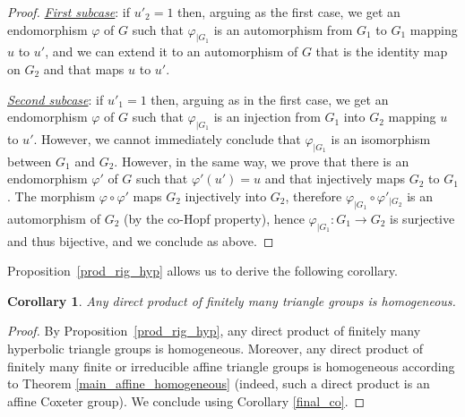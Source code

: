 \documentclass[a4paper, 11pt]{amsart}
\newtheorem{co}[te]{Corollary}
\theoremstyle{definition}
\theoremstyle{remark}
\renewcommand{\geq}{\geqslant}
\begin{document}
\begin{proof}
\smallskip \noindent 
\underline{\emph{First subcase}}: if $u'_2=1$ then, arguing as the first case, we get an endomorphism $\varphi$ of $G$ such that $\varphi_{\vert G_1}$ is an automorphism from $G_1$ to $G_1$ mapping $u$ to $u'$, and we can extend it to an automorphism of $G$ that is the identity map on $G_2$ and that maps $u$ to $u'$.

\smallskip \noindent
\underline{\emph{Second subcase}}: if $u'_1=1$ then, arguing as in the first case, we get an endomorphism $\varphi$ of $G$ such that $\varphi_{\vert G_1}$ is an injection from $G_1$ into $G_2$ mapping $u$ to $u'$. However, we cannot immediately conclude that $\varphi_{\vert G_1}$ is an isomorphism between $G_1$ and $G_2$. However, in the same way, we prove that there is an endomorphism $\varphi'$ of $G$ such that $\varphi'(u')=u$ and that injectively maps $G_2$ to $G_1$. The morphism $\varphi\circ \varphi'$ maps $G_2$ injectively into $G_2$, therefore $\varphi_{\vert G_1}\circ \varphi'_{\vert G_2}$ is an automorphism of $G_2$ (by the co-Hopf property), hence $\varphi_{\vert G_1}: G_1\rightarrow G_2$ is surjective and thus bijective, and we conclude as above.\end{proof}

Proposition~\ref{prod_rig_hyp} allows us to derive the following corollary.

\begin{co}\label{cor_triangle}
Any direct product of finitely many triangle groups is homogeneous.   
\end{co}

\begin{proof}
By Proposition~\ref{prod_rig_hyp}, any direct product of finitely many hyperbolic triangle groups is homogeneous. Moreover, any direct product of finitely many finite or irreducible affine triangle groups is homogeneous according to Theorem \ref{main_affine_homogeneous} (indeed, such a direct product is an affine Coxeter group). We conclude using Corollary \ref{final_co}.\end{proof}



\end{document}
